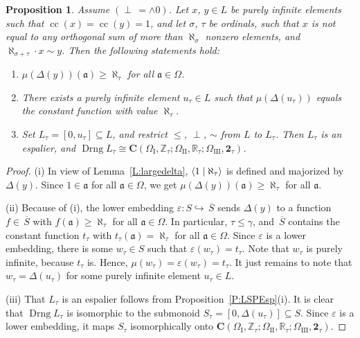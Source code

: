\documentclass[psamsfonts,reqno]{memo-l}
\theoremstyle{plain}
\newtheorem{proposition}[lemma]{Proposition}
\theoremstyle{definition}
\theoremstyle{remark}
\numberwithin{equation}{section}
\newcommand{\two}{\mathbf{2}}
\newcommand{\ol}[1]{\,\overline{\!#1}}
\newcommand{\scal}[2]{\left\langle\nobreak#1\nobreak\mid\nobreak#2
\nobreak\right\rangle}
\newcommand{\CC}{\mathbf{C}}
\newcommand{\fa}{\mathfrak{a}}
\newcommand{\I}{\mathrm{I}}
\newcommand{\II}{\mathrm{II}}
\newcommand{\III}{\mathrm{III}}
\newcommand{\ZZ}{\mathbb{Z}}
\newcommand{\RR}{\mathbb{R}}
\DeclareMathOperator{\cc}{cc}
\DeclareMathOperator{\Drng}{Drng}
\begin{document}
\begin{proposition}\label{P:existconstant}
Assume $(\perp\,=\wedge0)$. Let $x$, $y\in L$ be purely infinite elements
such that $\cc(x)=\cc(y)=1$, and let
$\sigma$, $\tau$ be ordinals, such that $x$ is not equal to
any orthogonal sum of more than $\aleph_\sigma$ nonzero elements, and
$\aleph_{\sigma+\tau}\cdot x\sim y$. Then the following statements hold:
\begin{enumerate}
\item $\mu(\Delta(y))(\fa)\geq\aleph_\tau$ for all $\fa\in\Omega$.
\item There exists a purely infinite element $u_\tau\in L$ such
that $\mu(\Delta(u_\tau))$ equals the constant function with value
$\aleph_\tau$.
\item Set $L_\tau= [0,u_\tau]\subseteq L$, and restrict $\le$,
$\perp$, $\sim$ from $L$ to $L_\tau$. Then $L_\tau$ is an
espalier, and\index{Dzzrng@$\Drng L$} $\Drng L_\tau\cong
\CC(\Omega_{\I},\ZZ_\tau;
\Omega_{\II},\RR_\tau; \Omega_{\III},\two_\tau)$.
\end{enumerate}
\end{proposition}

\begin{proof} (i) In view of Lemma~\ref{L:largedelta},
$\scal{1}{\aleph_\tau}$ is defined and majorized by $\Delta(y)$.
Since $1\in\fa$ for all $\fa\in\Omega$, we get
$\mu(\Delta(y))(\fa)\geq\aleph_\tau$ for all $\fa$.

(ii) Because of (i), the lower embedding
$\varepsilon: S
\hookrightarrow \ol{S}$ sends $\Delta(y)$ to a function
$f\in\ol{S}$ with $f(\fa)\geq\aleph_\tau$ for all $\fa\in\Omega$.
In particular, $\tau\leq\gamma$, and $\ol{S}$ contains the
constant function $t_\tau$ with $t_\tau(\fa)= \aleph_\tau$ for all
$\fa\in\Omega$. Since $\varepsilon$ is a lower embedding, there is some $w_\tau\in S$ such that $\varepsilon(w_\tau)=
t_\tau$. Note that $w_\tau$ is purely infinite, because $t_\tau$ is. Hence,
$\mu(w_\tau)= \varepsilon(w_\tau)= t_\tau$. It just
remains to note that $w_\tau= \Delta(u_\tau)$ for some purely
infinite element $u_\tau\in L$.

(iii) That $L_\tau$ is an espalier follows from
Proposition~\ref{P:LSPEsp}(i). It is clear that\index{Dzzrng@$\Drng L$}
$\Drng L_\tau$ is isomorphic to the submonoid $S_\tau= [0,\Delta(u_\tau)]
\subseteq S$. Since
$\varepsilon$ is a lower embedding, it maps $S_\tau$
isomorphically onto $\CC(\Omega_{\I},\ZZ_\tau;
\Omega_{\II},\RR_\tau; \Omega_{\III},\two_\tau)$.
\end{proof}
\end{document}
